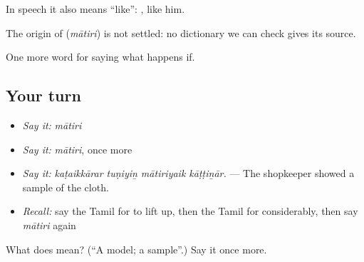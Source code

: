 In speech it also means \textquotedblleft{}like\textquotedblright{}:  , like him.

\begin{cousinweb}
The origin of \textbf{} (\emph{mātiri}) is not settled: no dictionary we can check gives its source.
\end{cousinweb}

\begin{grammarlens}[title={What you've built}]
One more word for saying what happens if.
\end{grammarlens}

\subsection*{Your turn}
\begin{itemize}
\raggedright
  \item \emph{Say it:} \emph{mātiri}
  \item \emph{Say it:} \emph{mātiri}, once more
  \item \emph{Say it:} \emph{kaṭaikkārar tuṇiyiṉ mātiriyaik kāṭṭiṉār.} — The shopkeeper showed a sample of the cloth.
  \item \emph{Recall:} say the Tamil for to lift up, then the Tamil for considerably, then say \emph{mātiri} again
\end{itemize}

\begin{tcolorbox}[breakable,colback=teal!4,colframe=teal!35!black,title={Before you move on}]
What does  mean? (\textquotedblleft{}A model; a sample\textquotedblright{}.) Say it once more.
\end{tcolorbox}
